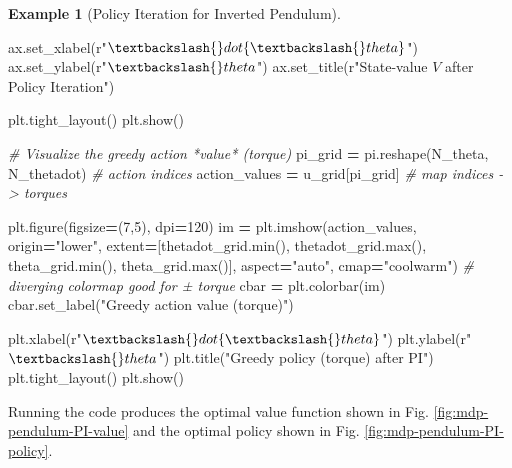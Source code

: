 \documentclass[
]{book}
\newenvironment{Shaded}{\begin{snugshade}}{\end{snugshade}}
\newcommand{\BuiltInTok}[1]{#1}
\newcommand{\CommentTok}[1]{\textcolor[rgb]{0.56,0.35,0.01}{\textit{#1}}}
\newcommand{\DecValTok}[1]{\textcolor[rgb]{0.00,0.00,0.81}{#1}}
\newcommand{\NormalTok}[1]{#1}
\newcommand{\OperatorTok}[1]{\textcolor[rgb]{0.81,0.36,0.00}{\textbf{#1}}}
\newcommand{\StringTok}[1]{\textcolor[rgb]{0.31,0.60,0.02}{#1}}
\newcommand{\VerbatimStringTok}[1]{\textcolor[rgb]{0.31,0.60,0.02}{#1}}
\theoremstyle{definition}
\theoremstyle{definition}
\newtheorem{example}{Example}[chapter]
\theoremstyle{definition}
\theoremstyle{definition}
\theoremstyle{remark}
\begin{document}
\begin{example}[Policy Iteration for Inverted Pendulum]
\begin{Shaded}
\begin{Highlighting}[]
\NormalTok{ax.set\_xlabel(}\VerbatimStringTok{r"$\textbackslash{}dot\{\textbackslash{}theta\}$"}\NormalTok{)}
\NormalTok{ax.set\_ylabel(}\VerbatimStringTok{r"$\textbackslash{}theta$"}\NormalTok{)}
\NormalTok{ax.set\_title(}\VerbatimStringTok{r"State{-}value $V$ after Policy Iteration"}\NormalTok{)}

\NormalTok{plt.tight\_layout()}
\NormalTok{plt.show()}

\CommentTok{\# Visualize the greedy action *value* (torque)}
\NormalTok{pi\_grid }\OperatorTok{=}\NormalTok{ pi.reshape(N\_theta, N\_thetadot)          }\CommentTok{\# action indices}
\NormalTok{action\_values }\OperatorTok{=}\NormalTok{ u\_grid[pi\_grid]                    }\CommentTok{\# map indices {-}\textgreater{} torques}

\NormalTok{plt.figure(figsize}\OperatorTok{=}\NormalTok{(}\DecValTok{7}\NormalTok{,}\DecValTok{5}\NormalTok{), dpi}\OperatorTok{=}\DecValTok{120}\NormalTok{)}
\NormalTok{im }\OperatorTok{=}\NormalTok{ plt.imshow(action\_values,}
\NormalTok{           origin}\OperatorTok{=}\StringTok{"lower"}\NormalTok{,}
\NormalTok{           extent}\OperatorTok{=}\NormalTok{[thetadot\_grid.}\BuiltInTok{min}\NormalTok{(), thetadot\_grid.}\BuiltInTok{max}\NormalTok{(),}
\NormalTok{                   theta\_grid.}\BuiltInTok{min}\NormalTok{(), theta\_grid.}\BuiltInTok{max}\NormalTok{()],}
\NormalTok{           aspect}\OperatorTok{=}\StringTok{"auto"}\NormalTok{, cmap}\OperatorTok{=}\StringTok{"coolwarm"}\NormalTok{)         }\CommentTok{\# diverging colormap good for ± torque}
\NormalTok{cbar }\OperatorTok{=}\NormalTok{ plt.colorbar(im)}
\NormalTok{cbar.set\_label(}\StringTok{"Greedy action value (torque)"}\NormalTok{)}

\NormalTok{plt.xlabel(}\VerbatimStringTok{r"$\textbackslash{}dot\{\textbackslash{}theta\}$"}\NormalTok{)}
\NormalTok{plt.ylabel(}\VerbatimStringTok{r"$\textbackslash{}theta$"}\NormalTok{)}
\NormalTok{plt.title(}\StringTok{"Greedy policy (torque) after PI"}\NormalTok{)}
\NormalTok{plt.tight\_layout()}
\NormalTok{plt.show()}
\end{Highlighting}
\end{Shaded}

Running the code produces the optimal value function shown in Fig. \ref{fig:mdp-pendulum-PI-value} and the optimal policy shown in Fig. \ref{fig:mdp-pendulum-PI-policy}.

\begin{figure}


\end{figure}
\end{example}
\end{document}
